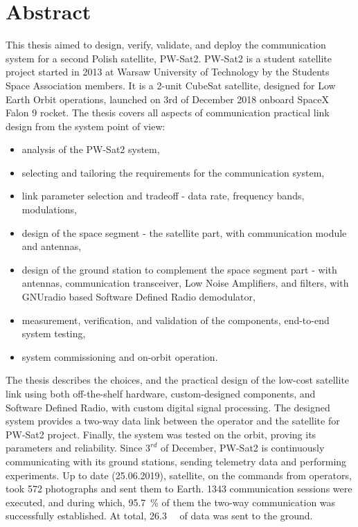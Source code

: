 \chapter{Abstract}

This thesis aimed to design, verify, validate, and deploy the communication system for a second Polish satellite, PW-Sat2. PW-Sat2 is a student satellite project started in 2013 at Warsaw University of Technology by the Students Space Association members. It is a 2-unit CubeSat satellite, designed for Low Earth Orbit operations, launched on 3rd of December 2018 onboard SpaceX Falon 9 rocket.
The thesis covers all aspects of communication practical link design from the system point of view:
\begin{itemize}
    \setlength\itemsep{0em}
    \item analysis of the PW-Sat2 system,
    \item selecting and tailoring the requirements for the communication system,
    \item link parameter selection and tradeoff - data rate, frequency bands, modulations,
    \item design of the space segment - the satellite part, with communication module and antennas,
    \item design of the ground station to complement the space segment part - with antennas, communication transceiver, Low Noise Amplifiers, and filters, with GNUradio based Software Defined Radio demodulator,
    \item measurement, verification, and validation of the components, end-to-end system testing,
    \item system commissioning and on-orbit operation.
\end{itemize}
The thesis describes the choices, and the practical design of the low-cost satellite link using both off-the-shelf hardware, custom-designed components, and Software Defined Radio, with custom digital signal processing. The designed system provides a two-way data link between the operator and the satellite for PW-Sat2 project. Finally, the system was tested on the orbit, proving its parameters and reliability. Since $3^{rd}$ of December, PW-Sat2 is continuously communicating with its ground stations, sending telemetry data and performing experiments. Up to date (25.06.2019), satellite, on the commands from operators, took \si{572} photographs and sent them to Earth. \si{1343} communication sessions were executed, and during which, \SI{95.7}{\percent} of them the two-way communication was successfully established. At total, \SI{26.3}{\mega\byte} of data was sent to the ground.
